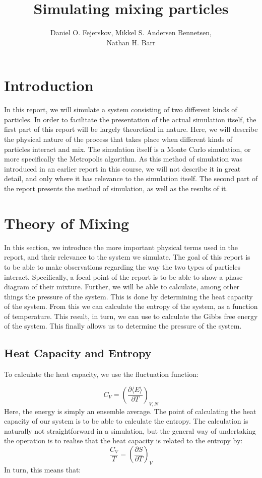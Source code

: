 \documentclass[12pt,a4paper]{report}
\begin{document}
\title{Simulating mixing particles}
\author{Daniel O. Fejerskov, Mikkel S. Andersen Bennetsen,\\ Nathan H. Barr}
\maketitle
\tableofcontents

\chapter{Introduction}
In this report, we will simulate a system consisting of two different kinds of particles. In order to facilitate the presentation of the actual simulation itself, the first part of this report will be largely theoretical in nature. Here, we will describe the physical nature of the process that takes place when different kinds of particles interact and mix. The simulation itself is a Monte Carlo simulation, or more specifically the Metropolis algorithm. As this method of simulation was introduced in an earlier report in this course, we will not describe it in great detail, and only where it has relevance to the simulation itself. The second part of the report presents the method of simulation, as well as the results of it.

\chapter{Theory of Mixing}
In this section, we introduce the more important physical terms used in the report, and their relevance to the system we simulate. The goal of this report is to be able to make observations regarding the way the two types of particles interact. Specifically, a focal point of the report is to be able to show a phase diagram of their mixture. Further, we will be able to calculate, among other things the pressure of the system. This is done by determining the heat capacity of the system. From this we can calculate the entropy of the system, as a function of temperature. This result, in turn, we can use to calculate the Gibbs free energy of the system. This finally allows us to determine the pressure of the system.

\section{Heat Capacity and Entropy}
To calculate the heat capacity, we use the fluctuation function:

\begin{equation}
C_V = \left( \frac{\partial \langle E \rangle}{\partial T} \right)_{V,N}
\end{equation}
Here, the energy is simply an ensemble average. The point of calculating the heat capacity of our system is to be able to calculate the entropy. The calculation is naturally not straightforward in a simulation, but the general way of undertaking the operation is to realise that the heat capacity is related to the entropy by:
\begin{equation}
\frac{C_V}{T} = \left( \frac{\partial S}{\partial T}\right)_V
\end{equation}
In turn, this means that:
\end{document}
